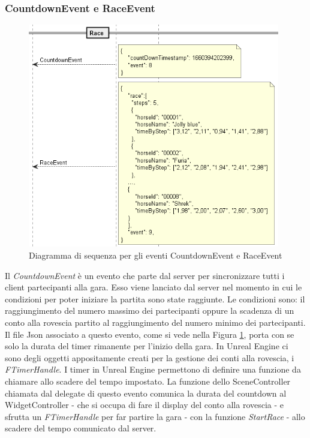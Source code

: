         \subsubsection{CountdownEvent e RaceEvent}

        \begin{figure}[t]\label{img:CountdownEvent}
            \centering
            \includegraphics[width=11cm]{figure/CountdownEvent.png}
            \caption{Diagramma di sequenza per gli eventi CountdownEvent e RaceEvent}
        \end{figure}

        Il \textit{CountdownEvent} è un evento che parte dal server per sincronizzare tutti i client partecipanti alla gara.
        Esso viene lanciato dal server nel momento in cui le condizioni per poter iniziare la partita sono state raggiunte.
        Le condizioni sono: il raggiungimento del numero massimo dei partecipanti oppure la scadenza di un conto alla rovescia partito al raggiungimento del numero minimo dei partecipanti.
        Il file Json associato a questo evento, come si vede nella Figura \ref{img:CountdownEvent}, porta con se solo la durata del timer rimanente per l'inizio della gara.
        In Unreal Engine ci sono degli oggetti appositamente creati per la gestione dei conti alla rovescia, i \textit{FTimerHandle}.
        I timer in Unreal Engine permettono di definire una funzione da chiamare allo scadere del tempo impostato.
        La funzione dello SceneController chiamata dal delegate di questo evento comunica la durata del countdown al WidgetController - che si occupa di fare il display del conto alla rovescia - e sfrutta un \textit{FTimerHandle} per far partire la gara - con la funzione \textit{StartRace} - allo scadere del tempo comunicato dal server.

